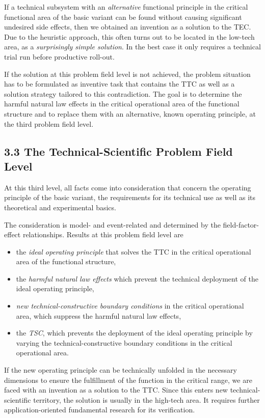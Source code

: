 \documentclass[12pt,a4paper]{article}
\begin{document}
If a technical subsystem with an \emph{alternative} functional principle in
the critical functional area of the basic variant can be found without causing
significant undesired side effects, then we obtained an invention as a
solution to the TEC. Due to the heuristic approach, this often turns out to be
located in the low-tech area, as a \emph{surprisingly simple solution}.  In
the best case it only requires a technical trial run before productive
roll-out.

If the solution at this problem field level is not achieved, the problem
situation has to be formulated as inventive task that contains the TTC as well
as a solution strategy tailored to this contradiction. The goal is to
determine the harmful natural law effects in the critical operational area of
the functional structure and to replace them with an alternative, known
operating principle, at the third problem field level.

\subsection*{3.3 The Technical-Scientific Problem Field Level}

At this third level, all facts come into consideration that concern the
operating principle of the basic variant, the requirements for its technical
use as well as its theoretical and experimental basics.

The consideration is model- and event-related and determined by the
field-factor-effect relationships.  Results at this problem field level are
\begin{itemize}
\item the \emph{ideal operating principle} that solves the TTC in the critical
  operational area of the functional structure,
\item the \emph{harmful natural law effects} which prevent the technical
  deployment of the ideal operating principle,
\item \emph{new technical-constructive boundary conditions} in the critical
  operational area, which suppress the harmful natural law effects,
\item the \emph{TSC}, which prevents the deployment of the ideal operating
  principle by varying the technical-constructive boundary conditions in the
  critical operational area.
\end{itemize}

If the new operating principle can be technically unfolded in the necessary
dimensions to ensure the fulfillment of the function in the critical range, we
are faced with an invention as a solution to the TTC. Since this enters new
technical-scientific territory, the solution is usually in the high-tech
area. It requires further application-oriented fundamental research for its
verification.
\end{document}
